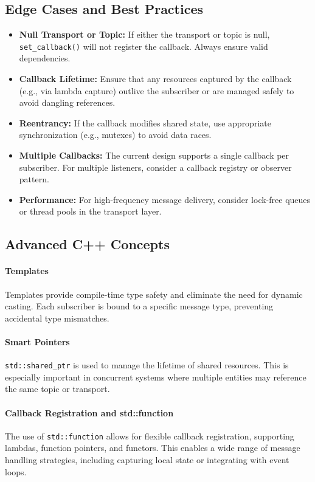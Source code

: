 \documentclass[12pt]{report}
\begin{document}
\subsection{Edge Cases and Best Practices}
\begin{itemize}
    \item \textbf{Null Transport or Topic:} If either the transport or topic is null, \texttt{set\_callback()} will not register the callback. Always ensure valid dependencies.
    \item \textbf{Callback Lifetime:} Ensure that any resources captured by the callback (e.g., via lambda capture) outlive the subscriber or are managed safely to avoid dangling references.
    \item \textbf{Reentrancy:} If the callback modifies shared state, use appropriate synchronization (e.g., mutexes) to avoid data races.
    \item \textbf{Multiple Callbacks:} The current design supports a single callback per subscriber. For multiple listeners, consider a callback registry or observer pattern.
    \item \textbf{Performance:} For high-frequency message delivery, consider lock-free queues or thread pools in the transport layer.
\end{itemize}

\subsection{Advanced C++ Concepts}
\paragraph{Templates}
Templates provide compile-time type safety and eliminate the need for dynamic casting. Each subscriber is bound to a specific message type, preventing accidental type mismatches.

\paragraph{Smart Pointers}
\texttt{std::shared\_ptr} is used to manage the lifetime of shared resources. This is especially important in concurrent systems where multiple entities may reference the same topic or transport.

\paragraph{Callback Registration and std::function}
The use of \texttt{std::function} allows for flexible callback registration, supporting lambdas, function pointers, and functors. This enables a wide range of message handling strategies, including capturing local state or integrating with event loops.
\end{document}
